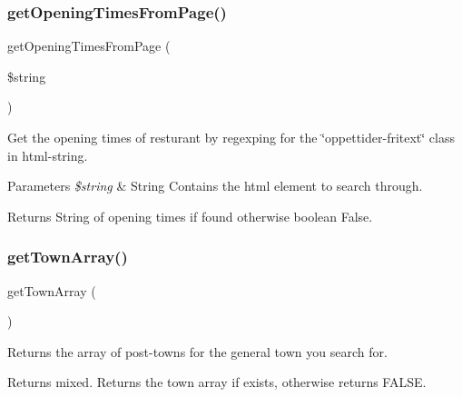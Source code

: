 \subsubsection{\texorpdfstring{get\+Opening\+Times\+From\+Page()}{getOpeningTimesFromPage()}}
{\footnotesize\ttfamily get\+Opening\+Times\+From\+Page (\begin{DoxyParamCaption}\item[{}]{\$string }\end{DoxyParamCaption})\hspace{0.3cm}{\ttfamily [protected]}}



Get the opening times of resturant by regexping for the \char`\"{}oppettider-\/fritext\char`\"{} class in html-\/string. 


\begin{DoxyParams}{Parameters}
{\em \$string} & String Contains the html element to search through. \\
\hline
\end{DoxyParams}
\begin{DoxyReturn}{Returns}
String of opening times if found otherwise boolean False. 
\end{DoxyReturn}
\hypertarget{veganistan_8php_a80deef1c368c57a83751d69eee0f9bec}{}\label{veganistan_8php_a80deef1c368c57a83751d69eee0f9bec} 
\subsubsection{\texorpdfstring{get\+Town\+Array()}{getTownArray()}}
{\footnotesize\ttfamily get\+Town\+Array (\begin{DoxyParamCaption}{ }\end{DoxyParamCaption})\hspace{0.3cm}{\ttfamily [protected]}}



Returns the array of post-\/towns for the general town you search for. 

\begin{DoxyReturn}{Returns}
mixed. Returns the town array if exists, otherwise returns F\+A\+L\+SE. 
\end{DoxyReturn}
\hypertarget{veganistan_8php_a26c5d831dbe4c547a37559dc76d68c8b}{}\label{veganistan_8php_a26c5d831dbe4c547a37559dc76d68c8b} 
